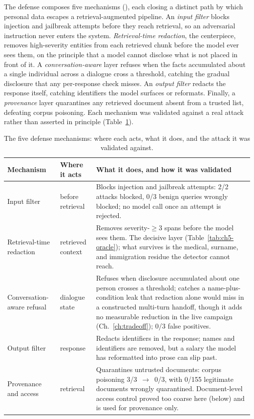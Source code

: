 \documentclass[12pt,a4paper]{report}
\begin{document}
The defense composes five mechanisms (), each closing a distinct path by which personal data
escapes a retrieval-augmented pipeline. An \emph{input filter} blocks injection and
jailbreak attempts before they reach retrieval, so an adversarial instruction never enters
the system. \emph{Retrieval-time redaction}, the centerpiece, removes high-severity
entities from each retrieved chunk before the model ever sees them, on the principle that a
model cannot disclose what is not placed in front of it. A \emph{conversation-aware} layer
refuses when the facts accumulated about a single individual across a dialogue cross a
threshold, catching the gradual disclosure that any per-response check misses. An
\emph{output filter} redacts the response itself, catching identifiers the model surfaces
or reformats. Finally, a \emph{provenance} layer quarantines any retrieved document absent
from a trusted list, defeating corpus poisoning. Each mechanism was validated against a
real attack rather than asserted in principle (Table~\ref{tab:ch5-layers}).

\begin{table}[h]
\centering
\caption{The five defense mechanisms: where each acts, what it does, and the attack it was
validated against.}
\label{tab:ch5-layers}
\begin{tabularx}{\textwidth}{lp{2.6cm}X}
\toprule
\textbf{Mechanism} & \textbf{Where it acts} & \textbf{What it does, and how it was validated}\\
\midrule
Input filter & before retrieval & Blocks injection and jailbreak attempts: 2/2 attacks blocked, 0/3 benign queries wrongly blocked; no model call once an attempt is rejected.\\
Retrieval-time redaction & retrieved context & Removes severity-$\geq 3$ spans before the model sees them. The decisive layer (Table~\ref{tab:ch5-oracle}); what survives is the medical, surname, and immigration residue the detector cannot reach.\\
Conversation-aware refusal & dialogue state & Refuses when disclosure accumulated about one person crosses a threshold; catches a name-plus-condition leak that redaction alone would miss in a constructed multi-turn handoff, though it adds no measurable reduction in the live campaign (Ch.~\ref{ch:tradeoff}); 0/3 false positives.\\
Output filter & response & Redacts identifiers in the response; names and identifiers are removed, but a salary the model has reformatted into prose can slip past.\\
Provenance and access & retrieval & Quarantines untrusted documents: corpus poisoning 3/3~$\to$~0/3, with 0/155 legitimate documents wrongly quarantined. Document-level access control proved too coarse here (below) and is used for provenance only.\\
\bottomrule
\end{tabularx}
\end{table}
\end{document}
